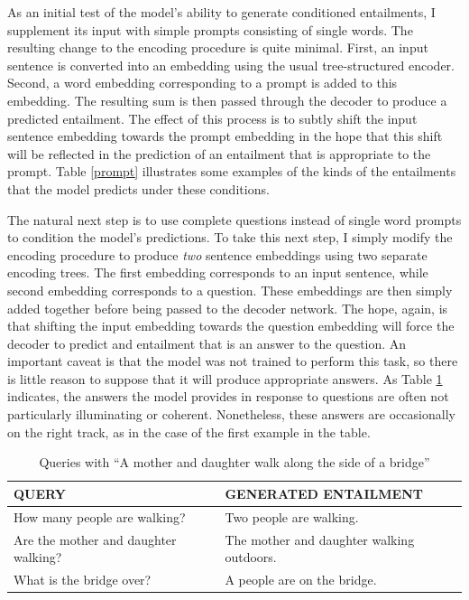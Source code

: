 As an initial test of the model's ability to generate conditioned entailments, I supplement its input with simple prompts consisting of single words. The resulting change to the encoding procedure is quite minimal. First, an input sentence is converted into an embedding using the usual tree-structured encoder. Second, a word embedding corresponding to a prompt is added to this embedding. The resulting sum is then passed through the decoder to produce a predicted entailment. The effect of this process is to subtly shift the input sentence embedding towards the prompt embedding in the hope that this shift will be reflected in the prediction of an entailment that is appropriate to the prompt. Table \ref{prompt} illustrates some examples of the kinds of the entailments that the model predicts under these conditions.  

The natural next step is to use complete questions instead of single word prompts to condition the model's predictions. To take this next step, I simply modify the encoding procedure to produce \textit{two} sentence embeddings using two separate encoding trees. The first embedding corresponds to an input sentence, while second embedding corresponds to a question. These embeddings are then simply added together before being passed to the decoder network. The hope, again, is that shifting the input embedding towards the question embedding will force the decoder to predict and entailment that is an answer to the question. An important caveat is that the model was not trained to perform this task, so there is little reason to suppose that it will produce appropriate answers. As Table \ref{query} indicates, the answers the model provides in response to questions are often not particularly illuminating or coherent. Nonetheless, these answers are occasionally on the right track, as in the case of the first example in the table.

\begin{table}[!t]
\begin{center} 
\caption{Queries with ``A mother and daughter walk along the side of a bridge''} 
\label{query} 

\vskip 0.07in
\setlength{\tabcolsep}{8pt}
\begin{tabular}{ll} 

\hline

\rule{0pt}{3ex} QUERY &  GENERATED ENTAILMENT \\

\hline
\rule{0pt}{3ex}How many people are walking? & Two people are walking.\\
 Are the mother and daughter walking? & The mother and daughter walking outdoors.  \\
 What is the bridge over? & A people are on the bridge. \\

\hline
\end{tabular}
\end{center} 
\end{table}

